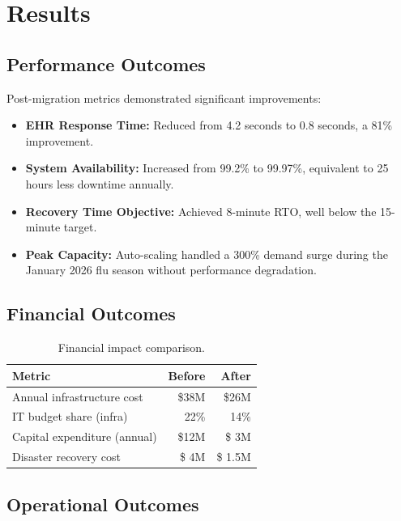 \documentclass[
    language=english,
    doctype=article,
    institution=none,
]{../../omnilatex}
\begin{document}
\section{Results}

\subsection{Performance Outcomes}

Post-migration metrics demonstrated significant improvements:

\begin{itemize}
    \item \textbf{EHR Response Time:} Reduced from 4.2 seconds to 0.8
        seconds, a 81\% improvement.
    \item \textbf{System Availability:} Increased from 99.2\% to 99.97\%,
        equivalent to 25 hours less downtime annually.
    \item \textbf{Recovery Time Objective:} Achieved 8-minute RTO, well
        below the 15-minute target.
    \item \textbf{Peak Capacity:} Auto-scaling handled a 300\% demand
        surge during the January 2026 flu season without performance
        degradation.
\end{itemize}

\subsection{Financial Outcomes}

\begin{table}[h]
    \centering
    \begin{tabular}{lrr}
        \toprule
        \textbf{Metric} & \textbf{Before} & \textbf{After} \\
        \midrule
        Annual infrastructure cost  & \$38M  & \$26M \\
        IT budget share (infra)      & 22\%   & 14\% \\
        Capital expenditure (annual) & \$12M  & \$ 3M \\
        Disaster recovery cost       & \$ 4M  & \$ 1.5M \\
        \bottomrule
    \end{tabular}
    \caption{Financial impact comparison.}
\end{table}

\subsection{Operational Outcomes}
\end{document}

